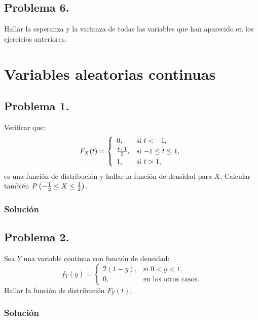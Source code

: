 \documentclass[
]{article}
\begin{document}
\hypertarget{problema-6.-1}{%
\subsection{Problema 6.}\label{problema-6.-1}}

Hallar la esperanza y la varianza de todas las variables que han
aparecido en los ejercicios anteriores.

\hypertarget{variables-aleatorias-continuas}{%
\section{Variables aleatorias
continuas}\label{variables-aleatorias-continuas}}

\hypertarget{problema-1.-1}{%
\subsection{Problema 1.}\label{problema-1.-1}}

Verificar que: \[
F_X (t)=
\left\{\begin{array}{ll}
0, & \mbox{si $t<-1$},
 \\[0.1cm]
{t+1\over 2}, & \mbox{si $-1\leq
t\leq 1$},
 \\[0.1cm]
1, & \mbox{si $t> 1$},
\end{array}\right.
\] es una función de distribución y hallar la función de densidad para
\(X\). Calcular también
\(P\left(-{1\over 2}\leq X\leq {1\over 2}\right)\).

\hypertarget{soluciuxf3n-6}{%
\subsubsection{Solución}\label{soluciuxf3n-6}}

\hypertarget{problema-2.-1}{%
\subsection{Problema 2.}\label{problema-2.-1}}

Sea \(Y\) una variable continua con función de densidad: \[
f_Y(y)=
\left\{\begin{array}{ll}
2(1-y), & \mbox{si $0<y<1$},\\ 0, & \mbox{en los otros casos}.
\end{array}\right.
\] Hallar la función de distribución \(F_Y(t)\).

\hypertarget{soluciuxf3n-7}{%
\subsubsection{Solución}\label{soluciuxf3n-7}}
\end{document}
